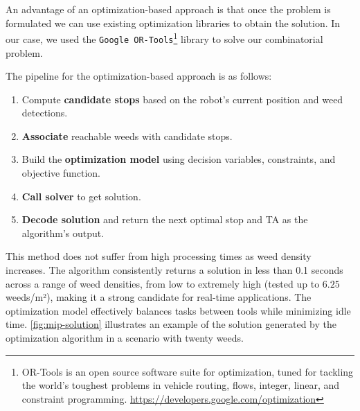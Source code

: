 An advantage of an optimization-based approach is that once the problem is formulated we can use existing optimization libraries to obtain the solution. In our case, we used the \texttt{Google OR-Tools}\footnote{OR-Tools is an open source software suite for optimization, tuned for tackling the world's toughest problems in vehicle routing, flows, integer, linear, and constraint programming. \url{https://developers.google.com/optimization}} library to solve our combinatorial problem.

The pipeline for the optimization-based approach is as follows:
\begin{enumerate}
    \item Compute \textbf{candidate stops} based on the robot's current position and weed detections.
    \item \textbf{Associate} reachable weeds with candidate stops.
    \item Build the \textbf{optimization model} using decision variables, constraints, and objective function.
    \item \textbf{Call solver} to get solution.
    \item \textbf{Decode solution} and return the next optimal stop and \ac{TA} as the algorithm's output.
\end{enumerate}

This method does not suffer from high processing times as weed density increases. The algorithm consistently returns a solution in less than 0.1 seconds across a range of weed densities, from low to extremely high (tested up to $6.25$ weeds/m²), making it a strong candidate for real-time applications. The optimization model effectively balances tasks between tools while minimizing idle time. \autoref{fig:mip-solution} illustrates an example of the solution generated by the optimization algorithm in a scenario with twenty weeds.

